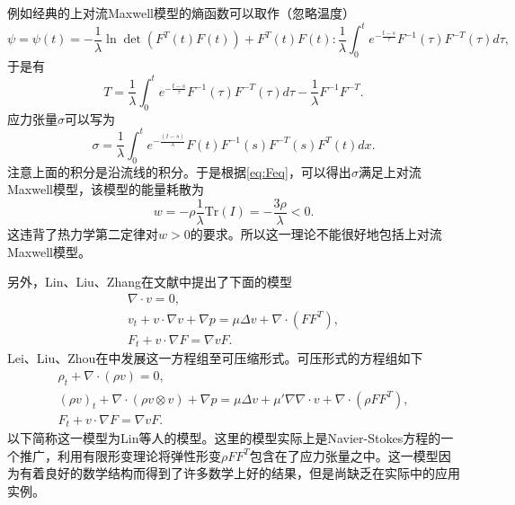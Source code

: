 例如经典的上对流Maxwell模型的熵函数可以取作（忽略温度）
\begin{equation*}
	\psi  = \psi(t) = - \frac{1}{\lambda}  \ln \det (F^T(t) F(t)) + F^T(t) F(t) : \frac{1}{\lambda}  \int_{0}^t e^{-\frac{t-s}{\tau}} F^{-1}(\tau) F^{-T}(\tau) d\tau,
\end{equation*}
于是有
\begin{equation*}
	T = \frac{1}{\lambda}  \int_{0}^t e^{-\frac{t-s}{\tau}} F^{-1}(\tau) F^{-T}(\tau) d\tau -\frac{1}{\lambda}  F^{-1} F^{-T} .
\end{equation*}
应力张量$\sigma$可以写为
\begin{equation*}
	\sigma = \frac{1}{\lambda} \int_{0}^{t} e^{-\frac{(t-s)}{\lambda} } F(t)  F^{-1}(s) F^{-T}(s) F^T(t)  dx.
\end{equation*}
注意上面的积分是沿流线的积分。于是根据\eqref{eq:Feq}，可以得出$\sigma$满足上对流Maxwell模型，该模型的能量耗散为
\begin{equation*}
	w = - \rho \frac{1}{\lambda} \mbox{Tr}(I) = -\frac{3\rho}{\lambda} < 0.
\end{equation*}
这违背了热力学第二定律对$w>0$的要求。所以这一理论不能很好地包括上对流Maxwell模型。


另外，Lin、Liu、Zhang在文献\cite{lin2005hydrodynamics}中提出了下面的模型
\begin{subequations}\label{eq:linincompressible}
	\begin{align}
		\nabla \cdot v = 0, \\
		v_t + v \cdot \nabla v + \nabla p = \mu \Delta v + \nabla \cdot( F F^T), \\
		F_t + v \cdot \nabla F = \nabla v F.
	\end{align}
\end{subequations}
Lei、Liu、Zhou在\cite{liu2008global}中发展这一方程组至可压缩形式。可压形式的方程组如下
\begin{subequations}\label{eq:lincompressible}
	\begin{align}
		\rho_t + \nabla \cdot (\rho v) = 0, \\
		(\rho v)_t + \nabla \cdot (\rho v \otimes v) + \nabla p = \mu \Delta v + \mu' \nabla \nabla \cdot v+ \nabla \cdot( \rho F F^T), \\
		F_t + v \cdot \nabla F = \nabla v F.
	\end{align}
\end{subequations}
以下简称这一模型为Lin等人的模型。这里的模型实际上是Navier-Stokes方程的一个推广，利用有限形变理论将弹性形变$\rho F F^T$包含在了应力张量之中。这一模型因为有着良好的数学结构而得到了许多数学上好的结果\cite{lin2012some}，但是尚缺乏在实际中的应用实例。


